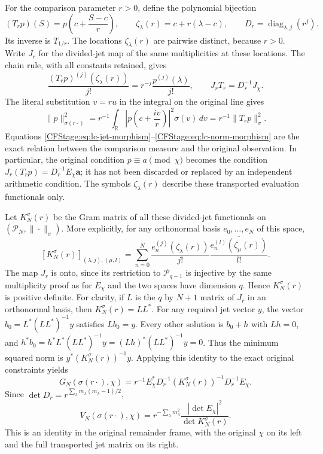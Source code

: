 For the comparison parameter $r>0$, define the polynomial bijection
\[
 (T_rp)(S)=p\left(c+\frac{S-c}{r}\right),
 \qquad
 \zeta_\lambda(r)=c+r(\lambda-c),
 \qquad
 D_r=\operatorname{diag}_{\lambda,j}(r^j).
 \tag{LC.10}\label{CFStage:eq:lc-pullback}
\]
Its inverse is $T_{1/r}$. The locations $\zeta_\lambda(r)$ are pairwise
distinct, because $r>0$. Write $J_r$ for the divided-jet map of the same
multiplicities at these locations. The chain rule, with all constants
retained, gives
\[
 \frac{(T_rp)^{(j)}(\zeta_\lambda(r))}{j!}
 =r^{-j}\frac{p^{(j)}(\lambda)}{j!},
 \qquad J_rT_r=D_r^{-1}J_\chi.
 \tag{LC.11}\label{CFStage:eq:lc-jet-morphism}
\]
The literal substitution $v=ru$ in the integral on the original line gives
\[
 \|p\|_{\sigma(r\cdot)}^2
 =r^{-1}\int_{\mathbb R}
 \left|p\left(c+\frac{iv}{r}\right)\right|^2\sigma(v)\,dv
 =r^{-1}\|T_rp\|_\sigma^2.
 \tag{LC.12}\label{CFStage:eq:lc-norm-morphism}
\]
Equations \eqref{CFStage:eq:lc-jet-morphism}--\eqref{CFStage:eq:lc-norm-morphism} are the
exact relation between the comparison measure and the original observation.
In particular, the original condition $p\equiv a\pmod\chi$ becomes the
condition $J_r(T_rp)=D_r^{-1}E_\chi\boldsymbol a$; it has not been discarded
or replaced by an independent arithmetic condition. The symbols
$\zeta_\lambda(r)$ describe these transported evaluation functionals only.

Let $K_N^\sigma(r)$ be the Gram matrix of all these divided-jet functionals
on $(\mathcal P_N,\|\cdot\|_\sigma)$. More explicitly, for any orthonormal
basis $e_0,\ldots,e_N$ of this space,
\[
 [K_N^\sigma(r)]_{(\lambda,j),(\mu,l)}
 =\sum_{n=0}^N
 \frac{e_n^{(j)}(\zeta_\lambda(r))}{j!}
 \overline{\frac{e_n^{(l)}(\zeta_\mu(r))}{l!}}.
 \tag{LC.13}\label{CFStage:eq:lc-kernel-definition}
\]
The map $J_r$ is onto, since its restriction to $\mathcal P_{q-1}$ is
injective by the same multiplicity proof as for $E_\chi$ and the two spaces
have dimension $q$. Hence $K_N^\sigma(r)$ is positive definite.
For clarity, if $L$ is the $q$ by $N+1$ matrix of $J_r$ in an orthonormal
basis, then $K_N^\sigma(r)=LL^*$. For any required jet vector $y$, the vector
$b_0=L^*(LL^*)^{-1}y$ satisfies $Lb_0=y$. Every other solution is $b_0+h$
with $Lh=0$, and
$h^*b_0=h^*L^*(LL^*)^{-1}y=(Lh)^*(LL^*)^{-1}y=0$.
Thus the minimum squared norm is $y^*(K_N^\sigma(r))^{-1}y$.
Applying this identity to the exact original constraints yields
\[
 \boxed{
 G_N(\sigma(r\cdot),\chi)
 =r^{-1}E_\chi^*D_r^{-1}
 (K_N^\sigma(r))^{-1}D_r^{-1}E_\chi.}
 \tag{LC.14}\label{CFStage:eq:lc-exact-matrix}
\]
Since $\det D_r=r^{\sum_\lambda m_\lambda(m_\lambda-1)/2}$,
\[
 \boxed{
 V_N(\sigma(r\cdot),\chi)
 =r^{-\sum_\lambda m_\lambda^2}
 \frac{|\det E_\chi|^2}{\det K_N^\sigma(r)}.}
 \tag{LC.15}\label{CFStage:eq:lc-exact-determinant}
\]
This is an identity in the original remainder frame, with the original
$\chi$ on its left and the full transported jet matrix on its right.


